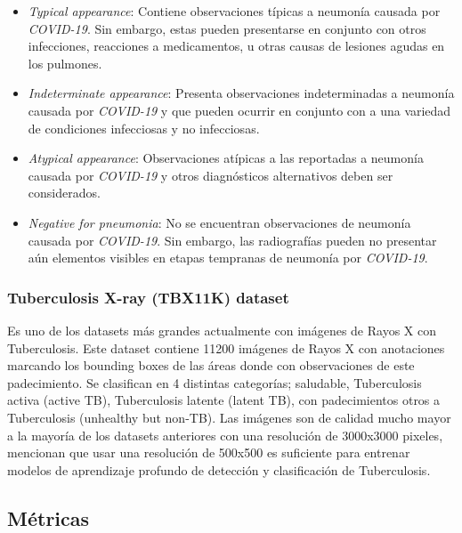 \begin{itemize}
    \item \textit{Typical appearance}: Contiene observaciones típicas a neumonía causada por
          \textit{COVID-19}. Sin embargo, estas pueden presentarse en conjunto con otros infecciones,
          reacciones a medicamentos, u otras causas de lesiones agudas en los pulmones.
    \item \textit{Indeterminate appearance}: Presenta observaciones indeterminadas a neumonía
          causada por \textit{COVID-19} y que pueden ocurrir en conjunto con a una variedad de
          condiciones infecciosas y no infecciosas.
    \item \textit{Atypical appearance}: Observaciones atípicas a las reportadas a neumonía causada
          por \textit{COVID-19} y otros diagnósticos alternativos deben ser considerados.
    \item \textit{Negative for pneumonia}: No se encuentran observaciones de neumonía causada por
          \textit{COVID-19}. Sin embargo, las radiografías pueden no presentar aún elementos visibles
          en etapas tempranas de neumonía por \textit{COVID-19}.
\end{itemize}

\subsubsection{Tuberculosis X-ray (TBX11K) dataset}

Es uno de los datasets más grandes actualmente con imágenes de Rayos X con Tuberculosis. Este
dataset contiene 11200 imágenes de Rayos X con anotaciones marcando los bounding boxes de las
áreas donde con observaciones de este padecimiento. Se clasifican en 4 distintas categorías;
saludable, Tuberculosis activa (active TB), Tuberculosis latente (latent TB), con padecimientos otros a
Tuberculosis (unhealthy but non-TB). Las imágenes son de calidad mucho mayor a la mayoría de los
datasets anteriores con una resolución de 3000x3000 pixeles, \citeauthor{9156613} mencionan que
usar una resolución de 500x500 es suficiente para entrenar modelos de aprendizaje profundo de
detección y clasificación de Tuberculosis.


\subsection{Métricas}
